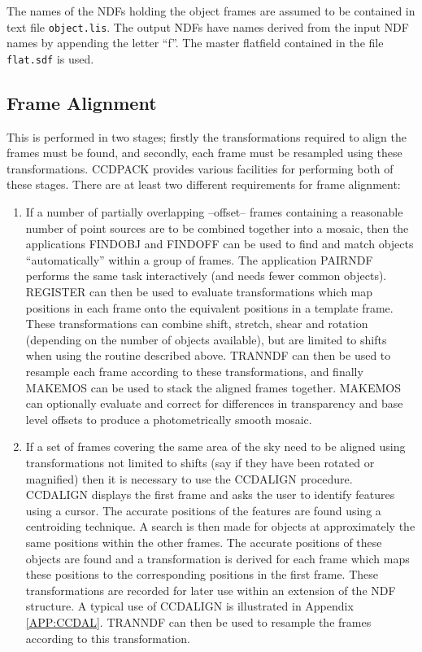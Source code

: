 The names of the {\small NDF}s holding the object frames are assumed to
be contained in text file \verb+object.lis+. The output {\small NDF}s
have names derived from the input {\small NDF} names by appending the
letter ``f''. The master flatfield contained in the file
\verb+flat.sdf+ is used.

\subsection{Frame Alignment}

This is performed in two stages; firstly the transformations required
to align the frames must be found, and secondly, each frame must be
resampled using these transformations. {\small CCDPACK} provides
various facilities for performing both of these stages. There are at
least two different requirements for frame alignment:

\begin{enumerate}

\item If a number of partially overlapping --offset-- frames containing
a reasonable number of point sources are to be combined together into a
mosaic, then the  applications {\small FINDOBJ} and {\small FINDOFF}
can be used to find and  match objects ``automatically'' within a group
of frames. The application {\small PAIRNDF} performs the same task
interactively (and needs fewer common objects). {\small REGISTER} can
then be used to evaluate transformations which map positions in each
frame onto the equivalent positions in a template frame. These
transformations can combine shift, stretch, shear and rotation
(depending on the number of objects available), but are limited to
shifts when using the routine described above. {\small TRANNDF} can
then be used to resample each frame according to these transformations,
and finally {\small MAKEMOS} can be used to stack the aligned frames
together. {\small MAKEMOS} can optionally evaluate and correct for
differences in transparency and base level offsets to produce a
photometrically smooth mosaic.

\item If a set of frames covering the same area of the sky need to be
aligned using transformations not limited to shifts (say if they have
been rotated or magnified) then it is necessary to use the {\small
CCDALIGN} procedure. {\small CCDALIGN} displays the first frame and
asks the user to identify features using a cursor. The accurate
positions of the features are found using a centroiding technique. A
search is then made for objects at approximately the same positions
within the other frames. The accurate positions of these objects are
found and a transformation is derived for each frame which maps these
positions to the corresponding positions in the first frame. These
transformations are recorded for later use within an extension of the
{\small NDF} structure. A typical use of {\small CCDALIGN} is
illustrated in Appendix \ref{APP:CCDAL}.  {\small TRANNDF} can then be
used to resample the frames according to this transformation.

\end{enumerate}

